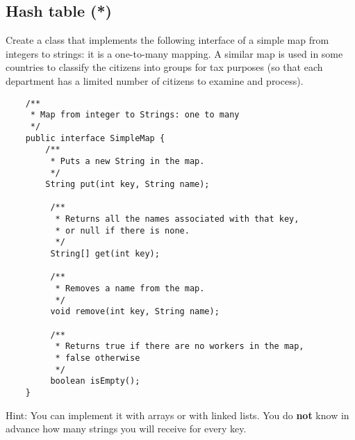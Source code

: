 \documentclass{article}
\begin{document}
\subsection{Hash table (*)}
\label{sec:simple-map-1}

Create a class that implements the following interface of a simple map
from integers to strings: it is a one-to-many mapping. 
A similar map is used in some countries to
classify the citizens into groups for tax purposes (so that each
department has a limited number of citizens to examine and process). 

\begin{verbatim}
    /**
     * Map from integer to Strings: one to many
     */
    public interface SimpleMap {
        /**
         * Puts a new String in the map. 
         */
        String put(int key, String name);
    
         /**
          * Returns all the names associated with that key, 
          * or null if there is none.
          */
         String[] get(int key);
    
         /**
          * Removes a name from the map.
          */
         void remove(int key, String name);
    
         /** 
          * Returns true if there are no workers in the map, 
          * false otherwise
          */
         boolean isEmpty();
    }
\end{verbatim}

Hint: You can implement it with arrays or with linked lists. You do
\textbf{not} know in advance how many strings you will receive for
every key.  


    



    

\end{document}
